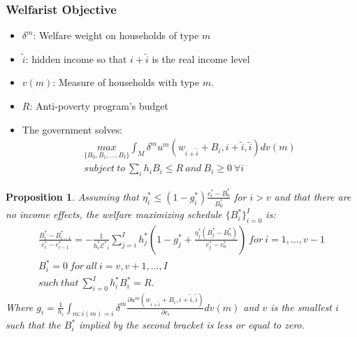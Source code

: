 \documentclass[xcolor=pdftex,dvipsnames,table]{beamer}
\newtheorem{prop}{Proposition}
\begin{document}
\begin{frame}[label=welfare]
 \frametitle{Welfarist Objective}
\begin{itemize}
\item $\delta^m$: Welfare weight on households of type $m$
\item $\tilde{i}$: hidden income so that $i+\tilde{i}$ is the real income level
\item $v(m)$: Measure of households with type $m$. 
\item $R$: Anti-poverty program's budget
\item The government solves:
\begin{align*}
\underset{\{B_0,B_1,...,B_I\}}{max} \int_M \delta^m u^m(w_{i+\tilde{i}}+B_i,i+\tilde{i},\tilde{i})dv(m)\\
subject\ to\ \sum_i h_iB_i \leq R\ and\ B_i\geq 0\ \forall i\nonumber
\end{align*}
\end{itemize}
\end{frame}

\begin{frame}[label=prop_wel]
\begin{prop}
	\label{prop_welfare}
	Assuming that $\eta^{*}_i\leq (1-g^*_i)\frac{c^*_i-B_0^*}{B_0^*}$ for $i>v$ and that there are no income effects, the welfare maximizing schedule $\{B^*_i\}_{i=0}^I$ is:
	\begin{align*}	
	\frac{B_i^*-B_{i-1}^*}{c^*_i-c^*_{i-1}}=-\frac{1}{h^*_i\mathcal{E^*}_i}\sum_{j=i}^{I}h^*_j\left(1-g^*_j+\frac{\eta^*_j(B_j^*-B_0^*)}{c^*_j-c_0^*}\right)\ for\ i =1,...,v-1\\
	B^*_i = 0\ for\ all\ i = v, v+1, ...,I \nonumber\\
	such\ that\ \sum_{i=0}^I h^*_i B^*_i = R. \nonumber
	\end{align*}
	Where $g_i=\frac{1}{h_i}\int_{m:i(m)=i} \delta^m \frac{\partial u^m(w_{i+\tilde{i}}+B_i,i+\tilde{i},\tilde{i})}{\partial c_i} dv(m)$ and $v$ is the smallest $i$ such that the $B^*_i$ implied by the second bracket is less or equal to zero. 
\end{prop}
\end{frame}
\end{document}
